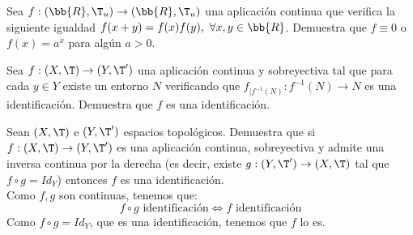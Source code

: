 \begin{ejercicio}
    Sea $f : (\bb{R}, \T_u) \to (\bb{R}, \T_u)$ una aplicación continua que verifica la siguiente igualdad $f(x + y) = f(x)f(y),~\forall x, y \in \bb{R}$. Demuestra que $f\equiv 0$ o $f(x) = a^x$ para algún $a > 0$.
\end{ejercicio}

\begin{ejercicio}
    Sea $f : (X,\T) \to (Y, \T')$ una aplicación continua y sobreyectiva tal que para cada $y \in Y$ existe un entorno $N$ verificando que $f_{\big|f^{-1}(N)} : f^{-1}(N) \to N$ es una identificación. Demuestra que $f$ es una identificación.
\end{ejercicio}

\begin{ejercicio}
    Sean $(X,\T)$ e $(Y, \T')$ espacios topológicos. Demuestra que si $f : (X,\T) \to (Y, \T')$ es una aplicación continua, sobreyectiva y admite una inversa continua por la derecha (es decir, existe $g : (Y, \T') \to (X,\T)$ tal que $f \circ g = Id_Y$) entonces $f$ es una identificación.\\

    Como $f,g$ son continuas, tenemos que:
    \begin{equation*}
        f\circ g\text{ identificación} \Longleftrightarrow f \text{ identificación} 
    \end{equation*}
    Como $f\circ g=Id_Y$, que es una identificación, tenemos que $f$ lo es.
\end{ejercicio}

